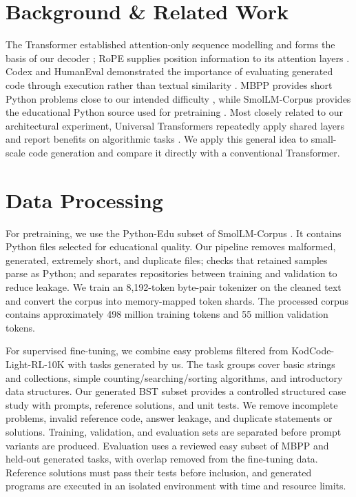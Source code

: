 \documentclass[final]{article}
\begin{document}
\section*{Background \& Related Work}
The Transformer established attention-only sequence modelling and forms the basis of our decoder \citep{vaswani2017attention}; RoPE supplies position information to its attention layers \citep{su2021roformer}. Codex and HumanEval demonstrated the importance of evaluating generated code through execution rather than textual similarity \citep{chen2021evaluating}. MBPP provides short Python problems close to our intended difficulty \citep{austin2021program}, while SmolLM-Corpus provides the educational Python source used for pretraining \citep{benallal2024smollm}. Most closely related to our architectural experiment, Universal Transformers repeatedly apply shared layers and report benefits on algorithmic tasks \citep{dehghani2019universal}. We apply this general idea to small-scale code generation and compare it directly with a conventional Transformer.

\section*{Data Processing}
For pretraining, we use the Python-Edu subset of SmolLM-Corpus \citep{benallal2024smollm}. It contains Python files selected for educational quality. Our pipeline removes malformed, generated, extremely short, and duplicate files; checks that retained samples parse as Python; and separates repositories between training and validation to reduce leakage. We train an 8,192-token byte-pair tokenizer on the cleaned text and convert the corpus into memory-mapped token shards. The processed corpus contains approximately 498 million training tokens and 55 million validation tokens.

For supervised fine-tuning, we combine easy problems filtered from KodCode-Light-RL-10K \citep{xu2025kodcode} with tasks generated by us. The task groups cover basic strings and collections, simple counting/searching/sorting algorithms, and introductory data structures. Our generated BST subset provides a controlled structured case study with prompts, reference solutions, and unit tests. We remove incomplete problems, invalid reference code, answer leakage, and duplicate statements or solutions. Training, validation, and evaluation sets are separated before prompt variants are produced. Evaluation uses a reviewed easy subset of MBPP and held-out generated tasks, with overlap removed from the fine-tuning data. Reference solutions must pass their tests before inclusion, and generated programs are executed in an isolated environment with time and resource limits.
\end{document}

